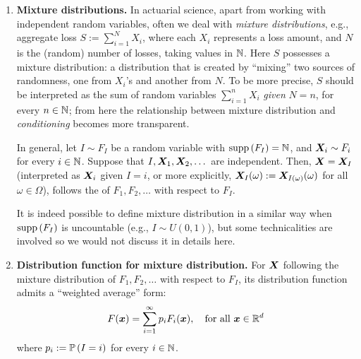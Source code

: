 \begin{enumerate}
\item\label{it:mixture-dist} \textbf{Mixture distributions.} In actuarial
science, apart from working with independent random variables, often we deal
with \emph{mixture distributions}, e.g., aggregate loss
\(S:=\sum_{i=1}^{N}X_i\), where each \(X_i\) represents a loss amount, and
\(N\) is the (random) number of losses, taking values in \(\mathbb{N}\). Here \(S\)
possesses a mixture distribution: a distribution that is created by ``mixing''
two sources of randomness, one from \(X_i\)'s and another from \(N\).  To be
more precise, \(S\) should be interpreted as the sum of random variables
\(\sum_{i=1}^{n}X_i\) \emph{given} \(N=n\), for every \(n\in\mathbb{N}\); from here the
relationship between mixture distribution and \emph{conditioning} becomes more
transparent.

In general, let \(I\sim F_I\) be a random variable with \(\operatorname{supp}\left(F_I\right)=\mathbb{N}\), and
\(\bm{X}_i\sim F_i\) for every \(i\in\mathbb{N}\). Suppose that
\(I,\bm{X}_1,\bm{X}_2,\dotsc\) are independent. Then,
\(\bm{X}=\bm{X}_{I}\) (interpreted as \(\bm{X}_i\) given \(I=i\), or more
explicitly, \(\bm{X}_{I}(\omega):=\bm{X}_{I(\omega)}(\omega)\) for all
\(\omega\in\Omega\)), follows the  of
\(F_1,F_2,\dotsc\) with respect to \(F_{I}\).

\begin{note}
It is indeed possible to define mixture distribution in a similar way when
\(\operatorname{supp}\left(F_I\right)\) is uncountable (e.g., \(I\sim U(0,1)\)), but some technicalities
are involved so we would not discuss it in details here.
\end{note}

\item\label{it:mixture-df} \textbf{Distribution function for mixture distribution.}
For \(\bm{X}\) following the mixture distribution of \(F_1,F_2,\dotsc\) with
respect to \(F_{I}\), its distribution function admits a ``weighted average''
form:
\[
F(\bm{x})=\sum_{i=1}^{\infty}p_iF_i(\bm{x}),\quad\text{for all \(\bm{x}\in\mathbb{R}^d\)}
\]
where \(p_i:=\mathbb{P}\left(I=i\right)\) for every \(i\in\mathbb{N}\).


\end{enumerate}
